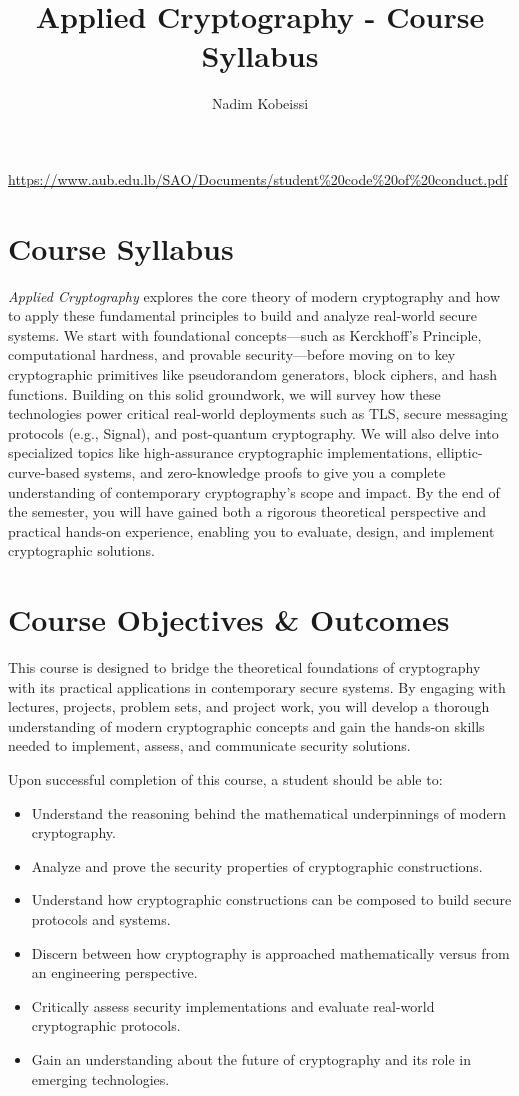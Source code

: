 \documentclass[10pt,a4paper,american]{exam}
\title{Applied Cryptography - Course Syllabus}
\author{Nadim Kobeissi}
\begin{document}
\classhandoutheader
\urldef{\urlcodeofconduct}\url{https://www.aub.edu.lb/SAO/Documents/student%20code%20of%20conduct.pdf}
\section*{Course Syllabus}

\textit{Applied Cryptography} explores the core theory of modern cryptography and how to apply these fundamental principles to build and analyze real-world secure systems. We start with foundational concepts—such as Kerckhoff's Principle, computational hardness, and provable security—before moving on to key cryptographic primitives like pseudorandom generators, block ciphers, and hash functions. Building on this solid groundwork, we will survey how these technologies power critical real-world deployments such as TLS, secure messaging protocols (e.g., Signal), and post-quantum cryptography. We will also delve into specialized topics like high-assurance cryptographic implementations, elliptic-curve-based systems, and zero-knowledge proofs to give you a complete understanding of contemporary cryptography's scope and impact. By the end of the semester, you will have gained both a rigorous theoretical perspective and practical hands-on experience, enabling you to evaluate, design, and implement cryptographic solutions.

\section{Course Objectives \& Outcomes}
This course is designed to bridge the theoretical foundations of cryptography with its practical applications in contemporary secure systems. By engaging with lectures, projects, problem sets, and project work, you will develop a thorough understanding of modern cryptographic concepts and gain the hands-on skills needed to implement, assess, and communicate security solutions.

Upon successful completion of this course, a student should be able to:

\begin{itemize}
	\item Understand the reasoning behind the mathematical underpinnings of modern cryptography.
	\item Analyze and prove the security properties of cryptographic constructions.
	\item Understand how cryptographic constructions can be composed to build secure protocols and systems.
	\item Discern between how cryptography is approached mathematically versus from an engineering perspective.
	\item Critically assess security implementations and evaluate real-world cryptographic protocols.
	\item Gain an understanding about the future of cryptography and its role in emerging technologies.
\end{itemize}
\end{document}

